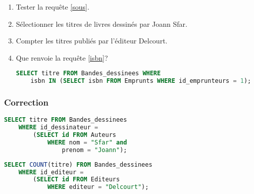 \documentclass[svgnames,11pt]{beamer}
\begin{document}
\begin{frame}[fragile]
    \frametitle{}

\begin{activite}
\begin{enumerate}
\item Tester la requête \ref{sous}.
\item Sélectionner les titres de livres dessinés par Joann Sfar.
\item Compter les titres publiés par l'éditeur Delcourt.
\item Que renvoie la requête \ref{isbn}?
\begin{center}
\begin{lstlisting}[language=SQL , basicstyle=\ttfamily\small, xleftmargin=1em, xrightmargin=0em]
SELECT titre FROM Bandes_dessinees WHERE 
    isbn IN (SELECT isbn FROM Emprunts WHERE id_emprunteurs = 1);
\end{lstlisting}
\label{isbn}
\end{center}
\end{enumerate}
\end{activite}

\end{frame}
\begin{frame}[fragile]
\frametitle{Correction}
\begin{center}
\begin{lstlisting}[language=SQL , basicstyle=\ttfamily\small, xleftmargin=1em, xrightmargin=0em]
SELECT titre FROM Bandes_dessinees
    WHERE id_dessinateur = 
        (SELECT id FROM Auteurs
            WHERE nom = "Sfar" and
                prenom = "Joann");
\end{lstlisting}
\end{center}   

\end{frame}
\begin{frame}[fragile]
\begin{center}
\begin{lstlisting}[language=SQL , basicstyle=\ttfamily\small, xleftmargin=1em, xrightmargin=0em]
SELECT COUNT(titre) FROM Bandes_dessinees
    WHERE id_editeur = 
        (SELECT id FROM Editeurs
            WHERE editeur = "Delcourt");
\end{lstlisting}
\end{center}   

\end{frame}
\end{document}
